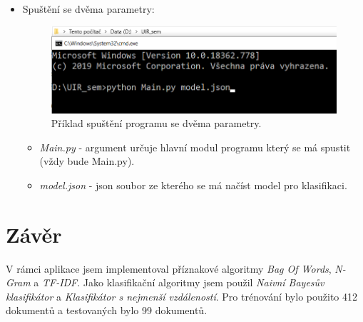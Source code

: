 \documentclass[
12pt,
a4paper,
pdftex,
czech,
titlepage
]{report}
\begin{document}
\begin{itemize}
{\begin{itemize}
\end{itemize}
\pagebreak
}
\item{Spuštění se dvěma parametry:
\begin{figure}[h]
\includegraphics[width=13cm]{obr2.png}
\caption{Příklad spuštění programu se dvěma parametry.}
\label{obr1}
\end{figure}
\begin{itemize}
\item{\textit{Main.py} - argument určuje hlavní modul programu který se má spustit (vždy bude Main.py).}
\item{\textit{model.json} - json soubor ze kterého se má načíst model pro klasifikaci.}
\end{itemize}
}
\end{itemize}

\chapter{Závěr}
V rámci aplikace jsem implementoval příznakové algoritmy \textit{Bag Of Words}, \textit{N-Gram} a \textit{TF-IDF}. Jako klasifikační algoritmy jsem použil \textit{Naivní Bayesův klasifikátor} a \textit{Klasifikátor s nejmenší vzdáleností}. Pro trénování bylo použito 412 dokumentů a testovaných bylo 99 dokumentů. 
\end{document}
